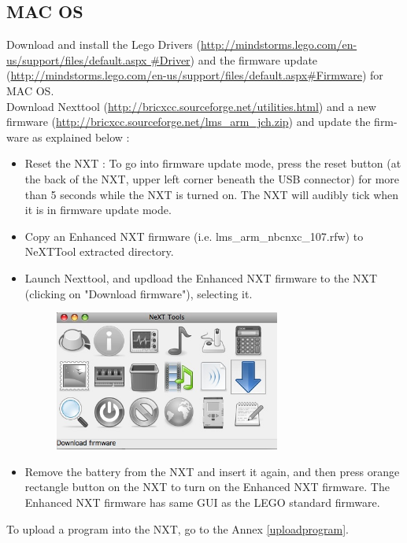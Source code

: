 \subsection{MAC OS}
Download and install the Lego Drivers (\href{http://mindstorms.lego.com/en-us/support/files/default.aspx#Driver}{http://mindstorms.lego.com/en-us/support/files/default.aspx
\#Driver}) and the firmware update (\href{http://mindstorms.lego.com/en-us/support/files/default.aspx#Firmware}{http://mindstorms.lego.com/en-us/support/files/default.aspx\#Firmware}) for MAC OS. \\
Download Nexttool (\href{http://bricxcc.sourceforge.net/utilities.html}{http://bricxcc.sourceforge.net/utilities.html}) and a new firmware (\href{http://bricxcc.sourceforge.net/lms_arm_jch.zip}{http://bricxcc.sourceforge.net/lms\_arm\_jch.zip}) and update the firm-ware as explained below :
\begin{itemize}
\item Reset the NXT : To go into firmware update mode, press the reset button (at the back of the NXT, upper left corner beneath the USB connector) for more than 5 seconds while the NXT is turned on. The NXT will audibly tick when it is in firmware update mode.
\item Copy an Enhanced NXT firmware (i.e. lms\_arm\_nbcnxc\_107.rfw) to NeXTTool extracted directory.
\item Launch Nexttool, and updload the Enhanced NXT firmware to the NXT (clicking on "Download firmware"), selecting it.
	\begin{figure}[h] %
   		\centering
		\includegraphics[width=0.7\textwidth]{pictures/firmware.jpg}
	\end{figure}
\item Remove the battery from the NXT and insert it again, and then press orange rectangle button on the NXT to turn on the Enhanced NXT firmware. The Enhanced NXT firmware has same GUI as the LEGO standard firmware.
\end{itemize}
To upload a program into the NXT, go to the Annex \ref{uploadprogram}.

